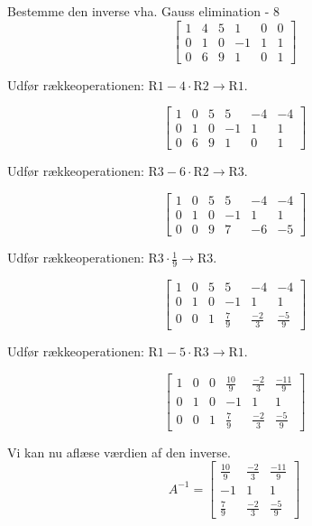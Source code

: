 \documentclass{article}
\begin{document}
\begin{exercise}{Bestemme den inverse vha. Gauss elimination - 8}
\hint
\[
\left[\begin{array}{ccc|ccc}
1 & 4 & 5 & 1 & 0 & 0 \\
0 & 1 & 0 & -1 & 1 & 1 \\
0 & 6 & 9 & 1 & 0 & 1
\end{array} \right]
\]

\hint
Udfør rækkeoperationen: $\text{R1} - 4 \cdot \text{R2} \to \text{R1}$.

\hint
\[
\left[\begin{array}{ccc|ccc}
1 & 0 & 5 & 5 & -4 & -4 \\
0 & 1 & 0 & -1 & 1 & 1 \\
0 & 6 & 9 & 1 & 0 & 1
\end{array} \right]
\]

\hint
Udfør rækkeoperationen: $\text{R3} - 6 \cdot \text{R2} \to \text{R3}$.

\hint
\[
\left[\begin{array}{ccc|ccc}
1 & 0 & 5 & 5 & -4 & -4 \\
0 & 1 & 0 & -1 & 1 & 1 \\
0 & 0 & 9 & 7 & -6 & -5
\end{array} \right]
\]

\hint
Udfør rækkeoperationen: $\text{R3} \cdot \frac{1}{9} \to \text{R3}$.

\hint
\[
\left[\begin{array}{ccc|ccc}
1 & 0 & 5 & 5 & -4 & -4 \\
0 & 1 & 0 & -1 & 1 & 1 \\
0 & 0 & 1 & \frac{7}{9} & \frac{-2}{3} & \frac{-5}{9}
\end{array} \right]
\]

\hint
Udfør rækkeoperationen: $\text{R1} - 5 \cdot \text{R3} \to \text{R1}$.

\hint
\[
\left[\begin{array}{ccc|ccc}
1 & 0 & 0 & \frac{10}{9} & \frac{-2}{3} & \frac{-11}{9} \\
0 & 1 & 0 & -1 & 1 & 1 \\
0 & 0 & 1 & \frac{7}{9} & \frac{-2}{3} & \frac{-5}{9}
\end{array} \right]
\]

\hint
Vi kan nu aflæse værdien af den inverse.
\[
A^{-1} = \left[\begin{array}{ccc}
\frac{10}{9} & \frac{-2}{3} & \frac{-11}{9} \\
-1 & 1 & 1 \\
\frac{7}{9} & \frac{-2}{3} & \frac{-5}{9}
\end{array} \right]
\]


\end{exercise}
\end{document}
